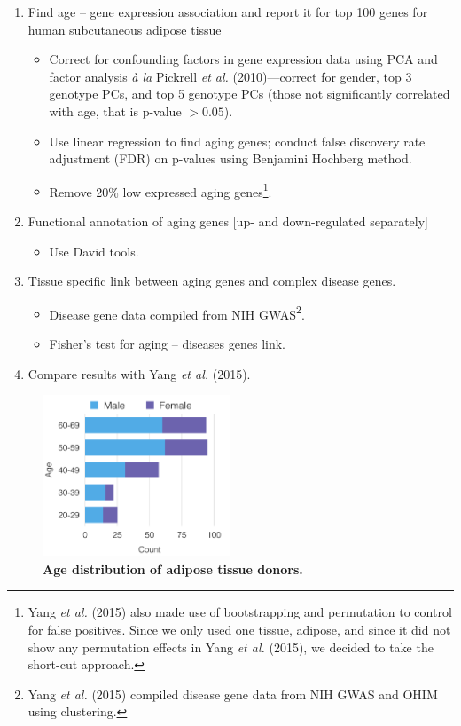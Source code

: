 \documentclass[11pt, oneside]{article}   	%
\begin{document}
\begin{enumerate}
\item Find age -- gene expression association and report it for top 100 genes for human subcutaneous adipose tissue
	\begin{itemize}
	\item Correct for confounding factors in gene expression data using PCA and factor analysis \emph{\`{a} la} Pickrell \emph{et al.} (2010)---correct for gender, top 3 genotype PCs, and top 5 genotype PCs (those not significantly correlated with age, that is p-value $>0.05$).
	\item Use linear regression to find aging genes; conduct false discovery rate adjustment (FDR) on p-values using Benjamini Hochberg method.
	\item Remove 20\% low expressed aging genes\footnote{Yang \emph{et al.} (2015) also made use of bootstrapping and permutation to control for false positives. Since we only used one tissue, adipose, and since it did not show any permutation effects in Yang \emph{et al.} (2015), we decided to take the short-cut approach.}.
	\end{itemize}
\item Functional annotation of aging genes [up- and down-regulated separately]
	\begin{itemize}
	\item Use David tools.
	\end{itemize}
\item Tissue specific link between aging genes and complex disease genes.
	\begin{itemize}
	\item Disease gene data compiled from NIH GWAS\footnote{Yang \emph{et al.} (2015) compiled disease gene data from NIH GWAS and OHIM using clustering.}.
	\item Fisher's test for aging -- diseases genes link.
	\end{itemize}
\item Compare results with Yang \emph{et al.} (2015).
\end{enumerate}

\begin{figure}[!ht]
    \centering
    \includegraphics[width=0.50\textwidth]{stats}
    \caption{\textbf{Age distribution of adipose tissue donors.}}
    \label{fig:stats}
\end{figure}
\end{document}
